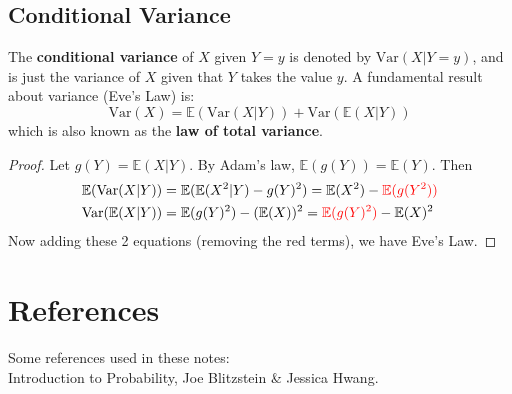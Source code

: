 \documentclass{article}
\begin{document}
\subsection{Conditional Variance}

\begin{definition}
    The \textbf{conditional variance} of $X$ given $Y = y$ is denoted by $\text{Var}(X | Y = y)$, and is just the variance of $X$ given that $Y$ takes the value $y$. A fundamental result about variance (Eve's Law) is: \begin{equation}
        \text{Var}(X) = \mathbb{E}(\text{Var} (X | Y)) + \text{Var}(\mathbb{E}(X | Y))
    \end{equation}
    \noindent which is also known as the \textbf{law of total variance}. 
\end{definition} 

\begin{proof}
    Let $g(Y) = \mathbb{E}(X | Y)$. By Adam's law, $ \mathbb{E}(g(Y)) = \mathbb{E}(Y)$. Then \begin{align*}
        \mathbb{E}(\text{Var}(X|Y)) &= \mathbb{E}(\mathbb{E}(X^{2}|Y) - g(Y)^{2}) = \mathbb{E}(X^{2}) - \textcolor{red}{\mathbb{E}(g(Y^{2}))} \\ 
        \text{Var}(\mathbb{E}(X | Y)) &= \mathbb{E}(g(Y)^{2}) - (\mathbb{E}(X))^{2} = \textcolor{red}{\mathbb{E}(g(Y)^{2})} - \mathbb{E}(X)^{2} 
    \end{align*}
    \noindent Now adding these 2 equations (removing the red terms), we have Eve's Law. 
\end{proof}





\newpage 

\section*{References}

Some references used in these notes: \\ 

Introduction to Probability, Joe Blitzstein \& Jessica Hwang. 
\end{document}
